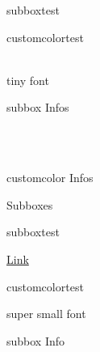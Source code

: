 \documentclass[10pt,a4paper]{article}
\begin{document}
\begin{multicols}{3}
\begin{multibox}{2}
\begin{subbox}{subbox}{test}
\\

\end{subbox}
\begin{subbox}{customcolor}{test}
\scriptsize


\\
\tiny
tiny font

\end{subbox}
\end{multibox}




\begin{multibox}{2} %
\begin{subbox}{subbox}{ Infos}

\\
\\

\end{subbox}
\begin{subbox}{customcolor}{ Infos}

\end{subbox}
\end{multibox}


\begin{textbox}{Subboxes}
\begin{multibox}{2} %
\begin{subbox}{subbox}{test}

\href{https://latex-ninja.com}{Link}
\end{subbox}
\begin{subbox}{customcolor}{test}
\scriptsize


\tiny
super small font

\end{subbox}
\end{multibox}

\begin{multibox}{2} %
\begin{subbox}{subbox}{ Info}

\\
\\


\end{subbox}
\end{multibox}
\end{textbox}
\end{multicols}
\end{document}
